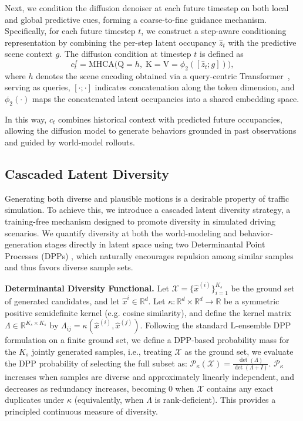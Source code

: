 \documentclass[runningheads]{llncs}
\begin{document}
Next, we condition the diffusion denoiser at each future timestep on both local and global predictive cues, forming a coarse-to-fine guidance mechanism. Specifically, for each future timestep $t$, we construct a step-aware conditioning representation by combining the per-step latent occupancy $\hat{z}_t$ with the predictive scene context $g$. The diffusion condition at timestep $t$ is defined as
\begin{equation*}
c^{f}_t
=
\mathrm{MHCA}
\big(
\mathrm{Q}=h,\;
\mathrm{K}=\mathrm{V}=
\phi_2([\hat{z}_t; g])
\big),
\end{equation*}
where $h$ denotes the scene encoding obtained via a query-centric Transformer~\cite{shi2024mtr++}, serving as queries, $[\cdot;\cdot]$ indicates concatenation along the token dimension, and $\phi_2(\cdot)$ maps the concatenated latent occupancies into a shared embedding space. 

In this way, $c_t$ combines historical context with predicted future occupancies, allowing the diffusion model to generate behaviors grounded in past observations and guided by world-model rollouts.


\vspace{-2mm}

\subsection{Cascaded Latent Diversity} \label{Latent_Diversity}

Generating both diverse and plausible motions is a desirable property of traffic simulation. To achieve this, we introduce a cascaded latent diversity strategy, a training-free mechanism designed to promote diversity in simulated driving scenarios. We quantify diversity at both the world-modeling and behavior-generation stages directly in latent space using two Determinantal Point Processes (DPPs) \cite{kulesza2012determinantal,morshed2025diverseflow}, which naturally encourages repulsion among similar samples and thus favors diverse sample sets.

\textbf{Determinantal Diversity Functional.} Let $\mathcal X = \{\hat{x}^{(i)}\}_{i=1}^{K_s}$ be the ground set of generated candidates, and let $\hat{x}^i\in\mathbb R^d$. Let $\kappa: \mathbb{R}^d \times \mathbb{R}^d \rightarrow \mathbb{R}$ be a symmetric positive semidefinite kernel (e.g. cosine similarity), and define the kernel matrix $\Lambda  \in \mathbb{R}^{{K_s} \times {K_s}}$ by $\Lambda_{i j}=\kappa(\hat{x}^{(i)}, \hat{x}^{(j)})$. Following the standard L-ensemble DPP formulation on a finite ground set, we define a DPP-based probability mass for the $K_s$ jointly generated samples, i.e., treating $\mathcal X$ as the ground set, we evaluate the DPP probability of selecting the full subset as:
$\mathcal P_{\kappa}(\mathcal X) =\frac{\operatorname{det}(\Lambda)}{\operatorname{det}(\Lambda+I)}$.
$\mathcal{P}_\kappa$ increases when samples are diverse and approximately linearly independent, and decreases as redundancy increases, becoming 0 when $\mathcal X$ contains any exact duplicates under $\kappa$ (equivalently, when $\Lambda$ is rank-deficient). This provides a principled continuous measure of diversity.
\end{document}
